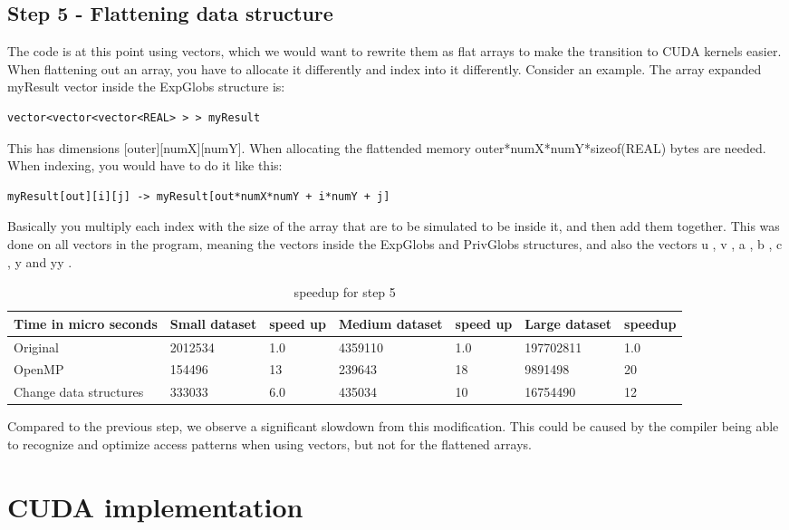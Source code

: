 \documentclass{article}
\begin{document}
\subsection*{Step 5 - Flattening data structure}
The code is at this point using vectors, which we would want to rewrite them as flat arrays to make the transition to CUDA kernels easier. When
flattening out an array, you have to allocate it differently and index into it differently. Consider an example. The array expanded myResult vector inside the
ExpGlobs structure is:
\begin{verbatim}
vector<vector<vector<REAL> > > myResult
\end{verbatim}
This has dimensions [outer][numX][numY]. When allocating the flattended memory outer*numX*numY*sizeof(REAL) bytes are needed. When indexing, you would have to do
it like this:
\begin{verbatim}
myResult[out][i][j] -> myResult[out*numX*numY + i*numY + j]
\end{verbatim}
Basically you multiply each index with the size of the array that are to be simulated to
be inside it, and then add them together. This was done on all vectors in the program, meaning the vectors inside the ExpGlobs and PrivGlobs
structures, and also the vectors u , v , a , b , c , y and yy .
\begin{table}[ht]
\centering
\caption{speedup for step 5}
\label{my-label6}
\begin{tabular}{|l|l|l|l|l|l|l|}
\hline
Time in micro seconds & Small dataset & speed up & Medium dataset & speed up & Large dataset & speedup \\ \hline
Original         & 2012534       &  1.0        & 4359110        &  1.0        & 197702811     &  1.0       \\ \hline
OpenMP           & 154496        &  13         & 239643         &  18         & 9891498       &  20       \\ \hline
Change data structures & 333033  &  6.0        & 435034         &  10         & 16754490      &  12       \\ \hline
\end{tabular}
\end{table}
Compared to the previous step, we observe a significant slowdown from this modification. This could be caused by the compiler being able to recognize and optimize access patterns when using vectors, but not for the flattened arrays.

\section*{CUDA implementation}
\end{document}
